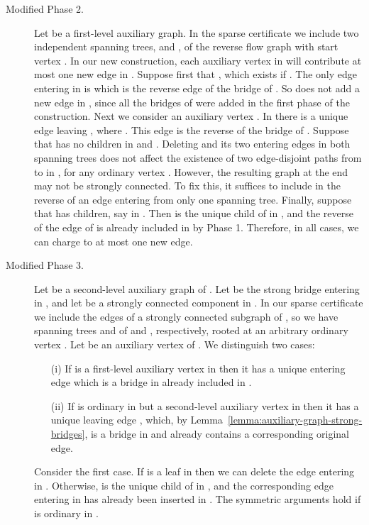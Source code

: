 \documentclass[11pt]{article}
\begin{document}
\begin{description}
\item[Modified Phase 2.] Let  be a first-level auxiliary graph.
In the sparse certificate we include two independent spanning trees,  and , of the reverse flow graph  with start vertex .
In our new construction, each auxiliary vertex  in  will contribute at most one new edge in .
Suppose first that
, which exists if . The only edge entering  in  is  which is the reverse edge of the bridge  of . So  does not add a new edge in , since all the bridges of  were added in the first phase of the construction.
Next we consider an auxiliary vertex . In  there is a unique edge  leaving , where .
This edge is the  reverse of the bridge  of .
Suppose that  has no children in  and .
Deleting  and its two entering edges in both spanning trees does not affect the existence of two edge-disjoint paths from  to  in , for any ordinary vertex .
However, the resulting graph  at the end may not be strongly connected.
To fix this, it suffices to include in  the reverse of an edge entering  from only one spanning tree.
Finally, suppose that  has children, say in .
Then  is the unique child of  in , and the reverse of the edge  of  is already included in  by Phase 1.
Therefore, in all cases, we can charge to  at most one new edge.

\item[Modified Phase 3.]
Let  be a second-level auxiliary graph of .
Let  be the strong bridge entering  in , and let  be a strongly connected component in .
In our sparse certificate we include the edges of a strongly connected subgraph of , so we have spanning trees  and  of  and , respectively, rooted at an arbitrary ordinary vertex .
Let  be an auxiliary vertex of . We distinguish two cases:
\begin{itemize}
\item[(i)] If  is a first-level auxiliary vertex in  then it has a unique entering edge  which is a bridge in  already included in .
\item[(ii)] If  is ordinary in  but a second-level auxiliary vertex in  then it has a unique leaving edge , which, by Lemma~\ref{lemma:auxiliary-graph-strong-bridges}, is a bridge in 
and  already contains a corresponding original edge.
\end{itemize}
Consider the first case. If  is a leaf in  then we can delete the edge entering  in .
Otherwise,  is the unique child of  in , and the corresponding edge  entering  in  has already been inserted in .
The symmetric arguments hold if  is ordinary in .


\end{description}
\end{document}
